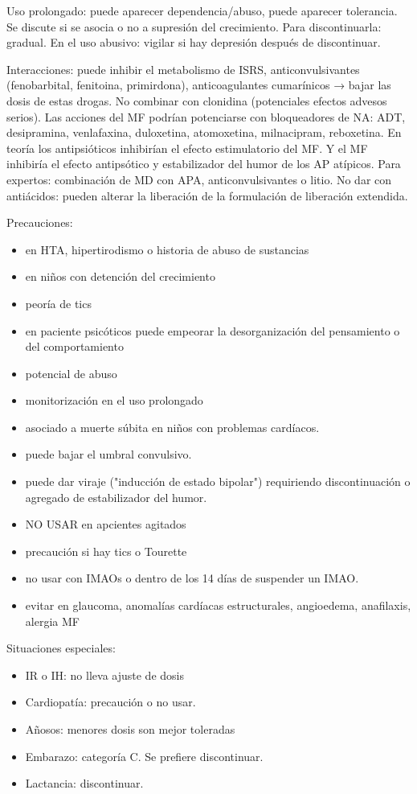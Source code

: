 Uso prolongado: puede aparecer dependencia/abuso, puede aparecer tolerancia. Se discute si se asocia o no a supresión del crecimiento. Para discontinuarla: gradual. En el uso abusivo: vigilar si hay depresión después de discontinuar.

Interacciones: puede inhibir el metabolismo de ISRS, anticonvulsivantes (fenobarbital, fenitoina, primirdona), anticoagulantes cumarínicos → bajar las dosis de estas drogas. No combinar con clonidina (potenciales efectos advesos serios). Las acciones del MF podrían potenciarse con bloqueadores de NA: ADT, desipramina, venlafaxina, duloxetina, atomoxetina, milnacipram, reboxetina. En teoría los antipsióticos inhibirían el efecto estimulatorio del MF\@. Y el MF inhibiría el efecto antipsótico y estabilizador del humor de los AP atípicos.
Para expertos: combinación de MD con APA, anticonvulsivantes o litio.
No dar con antiácidos: pueden alterar la liberación de la formulación de liberación extendida.

Precauciones:
\begin{itemize}
    \item en HTA, hipertirodismo o historia de abuso de sustancias
    \item en niños con detención del crecimiento
    \item peoría de tics
    \item en paciente psicóticos puede empeorar la desorganización del pensamiento o del comportamiento
    \item potencial de abuso
    \item monitorización en el uso prolongado
    \item asociado a muerte súbita en niños con problemas cardíacos.
    \item puede bajar el umbral convulsivo.
    \item puede dar viraje ("inducción de estado bipolar") requiriendo discontinuación o agregado de estabilizador del humor.
    \item NO USAR en apcientes agitados
    \item precaución si hay tics o Tourette
    \item no usar con IMAOs o dentro de los 14 días de suspender un IMAO.
    \item evitar en glaucoma, anomalías cardíacas estructurales, angioedema, anafilaxis, alergia MF
\end{itemize}
Situaciones especiales:
\begin{itemize}
    \item IR o IH: no lleva ajuste de dosis
    \item Cardiopatía: precaución o no usar.
    \item Añosos: menores dosis son mejor toleradas
    \item Embarazo: categoría C. Se prefiere discontinuar.
    \item Lactancia: discontinuar.
\end{itemize}
